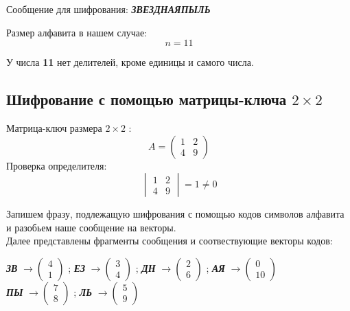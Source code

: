\documentclass[a5paper, 10pt]{article}
\theoremstyle{definition}
\theoremstyle{plain}
\theoremstyle{remark}
\begin{document}
Сообщение для шифрования: \textbf{\textit{ЗВЕЗДНАЯПЫЛЬ}}

Размер алфавита в нашем случае: $$n = 11 $$

У числа  \textbf{11} нет делителей, кроме единицы и самого числа.

\subsection{Шифрование с помощью матрицы-ключа $2 \times 2$}
Матрица-ключ размера  $2 \times 2$ :
\begin{equation}
A =
\begin{pmatrix}
1 & 2 \\
4 & 9
\end{pmatrix}
\end{equation}
Проверка определителя:
\begin{equation}
\begin{vmatrix}
1 & 2 \\
4 & 9
\end{vmatrix}
= 1 \neq 0
\end{equation}

Запишем фразу, подлежащую шифрования с помощью кодов символов алфавита и разобьем наше сообщение на векторы. \\
Далее представлены фрагменты сообщения и соотвествующие векторы кодов:
\begin{center}
\textbf{\textit{ЗВ}} $\to \begin{pmatrix}
 4\\
1
\end{pmatrix}$ ;
\textbf{\textit{ЕЗ}}  $\to \begin{pmatrix}
 3\\
4
\end{pmatrix}$ ;
\textbf{\textit{ДН}}  $\to \begin{pmatrix}
 2\\
6
\end{pmatrix}$ ;
\textbf{\textit{АЯ}}  $\to \begin{pmatrix}
 0\\
10
\end{pmatrix}$ \\
\textbf{\textit{ПЫ}}  $\to \begin{pmatrix}
 7\\
8
\end{pmatrix}$ ;
\textbf{\textit{ЛЬ}}  $\to \begin{pmatrix}
 5\\
9
\end{pmatrix}$ \\
\end{center}
\end{document}
